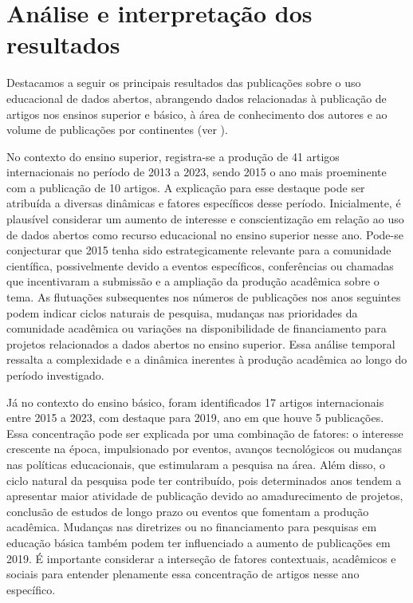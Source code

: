 \documentclass[portuguese]{textolivre}
\begin{document}
\section{Análise e interpretação dos resultados}\label{sec-organizacao-latex}
Destacamos a seguir os principais resultados das publicações sobre o uso educacional de dados abertos, abrangendo dados relacionadas à publicação de artigos nos ensinos superior e básico, à área de conhecimento dos autores e ao volume de publicações por continentes (ver ).

No contexto do ensino superior, registra-se a produção de 41 artigos internacionais no período de 2013 a 2023, sendo 2015 o ano mais proeminente com a publicação de 10 artigos. A explicação para esse destaque pode ser atribuída a diversas dinâmicas e fatores específicos desse período. Inicialmente, é plausível considerar um aumento de interesse e conscientização em relação ao uso de dados abertos como recurso educacional no ensino superior nesse ano. Pode-se conjecturar que 2015 tenha sido estrategicamente relevante para a comunidade científica, possivelmente devido a eventos específicos, conferências ou chamadas que incentivaram a submissão e a ampliação da produção acadêmica sobre o tema. As flutuações subsequentes nos números de publicações nos anos seguintes podem indicar ciclos naturais de pesquisa, mudanças nas prioridades da comunidade acadêmica ou variações na disponibilidade de financiamento para projetos relacionados a dados abertos no ensino superior. Essa análise temporal ressalta a complexidade e a dinâmica inerentes à produção acadêmica ao longo do período investigado.

Já no contexto do ensino básico, foram identificados 17 artigos internacionais entre 2015 a 2023, com destaque para 2019, ano em que houve 5 publicações. Essa concentração pode ser explicada por uma combinação de fatores: o interesse crescente na época, impulsionado por eventos, avanços tecnológicos ou mudanças nas políticas educacionais, que estimularam a pesquisa na área. Além disso, o ciclo natural da pesquisa pode ter contribuído, pois determinados anos tendem a apresentar maior atividade de publicação devido ao amadurecimento de projetos, conclusão de estudos de longo prazo ou eventos que fomentam a produção acadêmica. Mudanças nas diretrizes ou no financiamento para pesquisas em educação básica também podem ter influenciado a aumento de publicações em 2019. É importante considerar a interseção de fatores contextuais, acadêmicos e sociais para entender plenamente essa concentração de artigos nesse ano específico.
\end{document}
